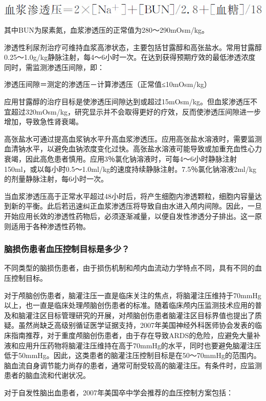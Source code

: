 \begin{center}
\includegraphics{./images/Image00276.jpg}
\end{center}

其中BUN为尿素氮，血浆渗透压的正常值为280～290mOsm/kg。

渗透性利尿剂治疗可维持血浆高渗状态，主要包括甘露醇和高张盐水。常用甘露醇0.25～1.0g/kg静脉注射，每4～6小时一次。在达到获得预期疗效的最低渗透浓度同时，需监测渗透压间隙，即：

渗透压间隙＝测定的渗透压－计算渗透压（正常值≤10mOsm/kg）

应用甘露醇的治疗目标是使渗透压间隙达到或超过15mOsm/kg。但血浆渗透压不宜超过320mOsm/kg，研究显示并不会取得更好的疗效，反而使渗透压间隙进一步增加，导致急性肾衰竭。

高张盐水可通过提高血浆钠水平升高血浆渗透压。应用高张盐水溶液时，需要监测血清钠水平，以避免血钠浓度变化过快。高张盐水溶液可能导致或加重充血性心力衰竭，因此高危患者慎用。应用3％氯化钠溶液时，可每4～6小时静脉注射150ml，或以每小时0.5～1.0ml/kg的速度持续静脉注射。7.5％氯化钠溶液2ml/kg的剂量静脉注射，每6小时一次。

当血浆渗透压高于正常水平超过48小时后，将产生细胞内渗透颗粒，细胞内容量达到新的平衡。此后若迅速纠正血浆渗透压将导致自由水进入颅内间隙。因此，一旦开始应用长效的渗透性药物后，必须逐渐减量，以便自发性渗透分子排出。这一原则适用于各种渗透性药物。

\subsubsection{脑损伤患者血压控制目标是多少？}

不同类型的脑损伤患者，由于损伤机制和颅内血流动力学特点不同，具有不同的血压控制目标。

对于颅脑创伤患者，脑灌注压一直是临床关注的焦点，将脑灌注压维持于70mmHg以上，也一直是临床处理颅脑创伤患者的标准。随着临床颅内压监测技术应用的普及和脑灌注区目标管理研究的开展，对颅脑创伤患者脑灌注区目标界值也提出了质疑。虽然尚缺乏高级别循证医学证据支持，2007年美国神经外科医师协会发表的临床指南推荐，对于重度颅脑创伤患者，由于存在导致ARDS的危险，应避免大量补液和应用升压药物将脑灌注压维持在高于70mmHg的水平，同时也要避免脑灌注压低于50mmHg。因此，这类患者的脑灌注压控制目标是在50～70mmHg的范围内。脑血流自身调节能力尚存的患者，通常可耐受较高的脑灌注压。有条件时，应监测患者的脑血流和代谢状况。

对于自发性脑出血患者，2007年美国卒中学会推荐的血压控制方案包括：

